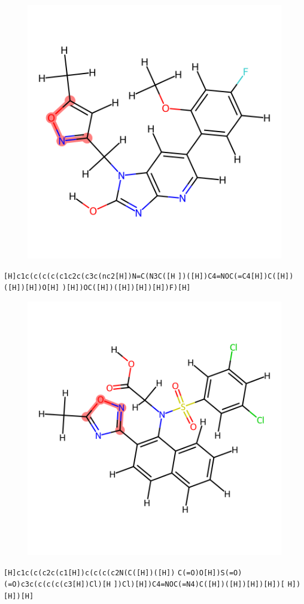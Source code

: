 \documentclass{article}
\begin{document}
\begin{figure}[ht]
\centering
    \includegraphics{mol50.png}
\end{figure}
\verb|[H]c1c(c(c(c(c1c2c(c3c(nc2[H])N=C(N3C([H| \verb|])([H])C4=NOC(=C4[H])C([H])([H])[H])O[H]| \verb|)[H])OC([H])([H])[H])[H])F)[H]|

\begin{figure}[ht]
\centering
    \includegraphics{mol51.png}
\end{figure}
\verb|[H]c1c(c(c2c(c1[H])c(c(c(c2N(C([H])([H])| \verb|C(=O)O[H])S(=O)(=O)c3c(c(c(c(c3[H])Cl)[H| \verb|])Cl)[H])C4=NOC(=N4)C([H])([H])[H])[H])[| \verb|H])[H])[H]|
\end{document}
